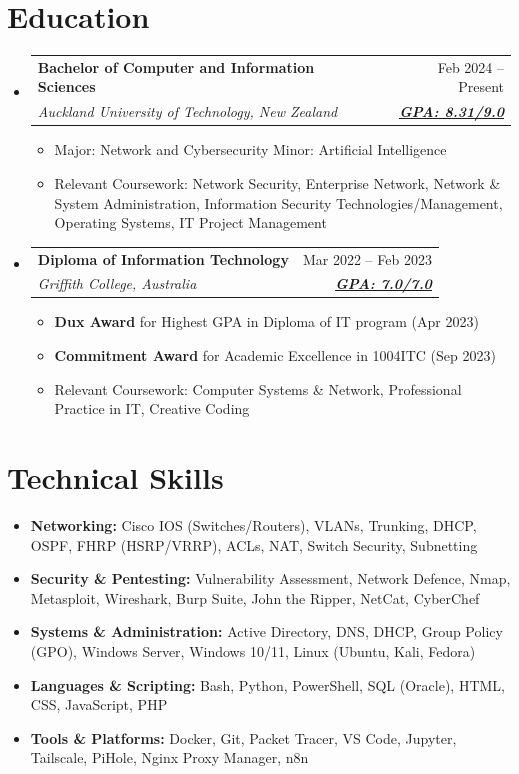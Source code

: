 \documentclass[letterpaper,11pt]{article}
\makeatletter
\newcommand{\resumeItem}[1]{\item\small{{#1}}}
\newcommand{\resumeSubheading}[4]{
  \item
    \begin{tabular*}{0.97\textwidth}[t]{l@{\extracolsep{\fill}}r}
      \textbf{#1} & #2 \\
      \textit{\small#3} & \textit{\small #4} \\
    \end{tabular*}
}
\newcommand{\resumeSubHeadingListStart}{\begin{itemize}[leftmargin=0.15in, label={}]}
\newcommand{\resumeSubHeadingListEnd}{\end{itemize}}
\newcommand{\resumeItemListStart}{\begin{itemize}[itemsep=4pt]}
\newcommand{\resumeItemListEnd}{\end{itemize}}
\makeatother
\begin{document}
\section{Education}
\resumeSubHeadingListStart
\resumeSubheading
{Bachelor of Computer and Information Sciences}{Feb 2024 -- Present}
{Auckland University of Technology, New Zealand}{\href{https://www.myequals.net/sharelink/a3168318-7040-408c-9632-4bf1eea10924/f50c0e80-bd4f-4d62-b03e-627e3f7331ac}{{\textbf{\underline{GPA: 8.31/9.0}}}}}
\resumeItemListStart
\resumeItem{Major: Network and Cybersecurity \quad Minor: Artificial Intelligence}
\resumeItem{Relevant Coursework: Network Security, Enterprise Network, Network \& System Administration, Information Security Technologies/Management, Operating Systems, IT Project Management}
\resumeItemListEnd
\resumeSubheading
{Diploma of Information Technology}{Mar 2022 -- Feb 2023}
{Griffith College, Australia}{\href{https://github.com/cyber-wpmm/Win-Academic.git}{{\textbf{\underline{GPA: 7.0/7.0}}}}}
\resumeItemListStart
\resumeItem{\textbf{Dux Award} for Highest GPA in Diploma of IT program (Apr 2023)}
\resumeItem{\textbf{Commitment Award} for Academic Excellence in 1004ITC (Sep 2023)}
\resumeItem{Relevant Coursework: Computer Systems \& Network, Professional Practice in IT, Creative Coding}
\resumeItemListEnd
\resumeSubHeadingListEnd

\section{Technical Skills}
\resumeSubHeadingListStart
  \resumeItem{\textbf{Networking:} Cisco IOS (Switches/Routers), VLANs, Trunking, DHCP, OSPF, FHRP (HSRP/VRRP), ACLs, NAT, Switch Security, Subnetting}
  \resumeItem{\textbf{Security \& Pentesting:} Vulnerability Assessment, Network Defence, Nmap, Metasploit, Wireshark, Burp Suite, John the Ripper, NetCat, CyberChef}
  \resumeItem{\textbf{Systems \& Administration:} Active Directory, DNS, DHCP, Group Policy (GPO), Windows Server, Windows 10/11, Linux (Ubuntu, Kali, Fedora)}
  \resumeItem{\textbf{Languages \& Scripting:} Bash, Python, PowerShell, SQL (Oracle), HTML, CSS, JavaScript, PHP}
  \resumeItem{\textbf{Tools \& Platforms:} Docker, Git, Packet Tracer, VS Code, Jupyter, Tailscale, PiHole, Nginx Proxy Manager, n8n}
\resumeSubHeadingListEnd

\end{document}
